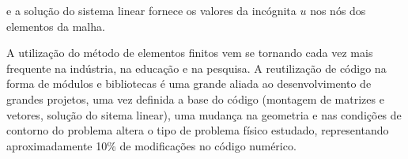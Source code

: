 \noindent e a solução do sistema linear fornece os valores da incógnita
$u$ nos nós dos elementos da malha.

A utilização do método de elementos finitos vem se tornando cada vez
mais frequente na indústria, na educação e na pesquisa. A reutilização
de código na forma de módulos e bibliotecas é uma grande aliada ao
desenvolvimento de grandes projetos, uma vez definida a base do código
(montagem de matrizes e vetores, solução do sitema linear), uma mudança
na geometria e nas condições de contorno do problema altera o tipo de
problema físico estudado, representando aproximadamente 10\% de
modificações no código numérico.   



